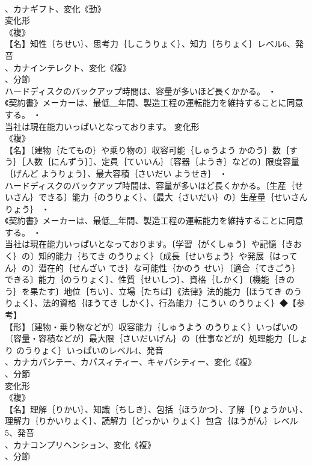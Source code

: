 \documentclass[8pt]{extreport}
\begin{document}
\begin{CJK}{UTF8}{min}
\\	、カナギフト、変化《動》
\\	変化形 
\\	《複》
\\	【名】知性｛ちせい｝、思考力｛しこうりょく｝、知力｛ちりょく｝レベル6、発音
\\	、カナインテレクト、変化《複》
\\	、分節
\\	ハードディスクのバックアップ時間は、容量が多いほど長くかかる。 ・
\\	《契約書》メーカーは、最低＿年間、製造工程の運転能力を維持することに同意する。 ・
\\	当社は現在能力いっぱいとなっております。	変化形 
\\	《複》
\\	【名】〔建物｛たてもの｝や乗り物の〕収容可能｛しゅうよう かのう｝数｛すう｝［人数｛にんずう｝］、定員｛ていいん｝〔容器｛ようき｝などの〕限度容量｛げんど ようりょう｝、最大容積｛さいだい ようせき｝ ・
\\	ハードディスクのバックアップ時間は、容量が多いほど長くかかる。〔生産｛せいさん｝できる〕能力｛のうりょく｝、〔最大｛さいだい｝の〕生産量｛せいさんりょう｝ ・
\\	《契約書》メーカーは、最低＿年間、製造工程の運転能力を維持することに同意する。 ・
\\	当社は現在能力いっぱいとなっております。〔学習｛がくしゅう｝や記憶｛きおく｝の〕知的能力｛ちてき のうりょく｝〔成長｛せいちょう｝や発展｛はってん｝の〕潜在的｛せんざい てき｝な可能性｛かのう せい｝〔適合｛てきごう｝できる〕能力｛のうりょく｝、性質｛せいしつ｝、資格｛しかく｝〔機能｛きのう｝を果たす〕地位｛ちい｝、立場｛たちば｝《法律》法的能力｛ほうてき のうりょく｝、法的資格｛ほうてき しかく｝、行為能力｛こうい のうりょく｝◆【参考】
\\	【形】〔建物・乗り物などが〕収容能力｛しゅうよう のうりょく｝いっぱいの〔容量・容積などが〕最大限｛さいだいげん｝の〔仕事などが〕処理能力｛しょり のうりょく｝いっぱいのレベル4、発音
\\	、カナカパシテー、カパスィティー、キャパシティー、変化《複》
\\	、分節
\\	変化形 
\\	《複》
\\	【名】理解｛りかい｝、知識｛ちしき｝、包括｛ほうかつ｝、了解｛りょうかい｝、理解力｛りかいりょく｝、読解力｛どっかい りょく｝包含｛ほうがん｝レベル5、発音
\\	、カナコンプリヘンション、変化《複》
\\	、分節

\end{CJK}
\end{document}
